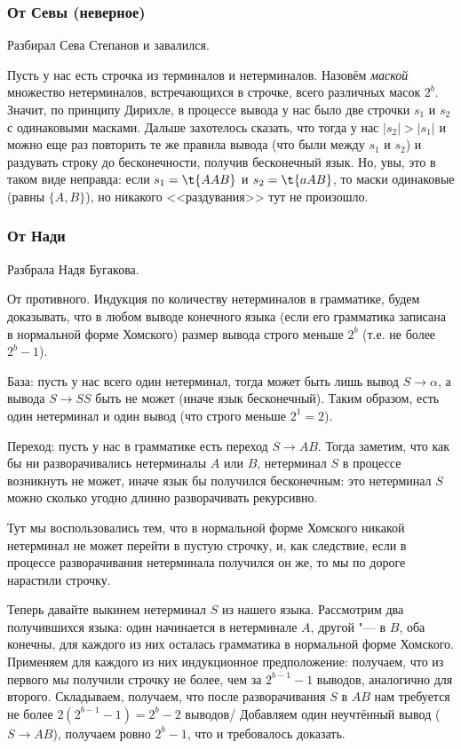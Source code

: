 	\subsubsection{От Севы (неверное)}
		Разбирал Сева Степанов и завалился.

		Пусть у нас есть строчка из терминалов и нетерминалов.
		Назовём \textit{маской} множество нетерминалов, встречающихся в строчке,
		всего различных масок $2^b$.
		Значит, по принципу Дирихле, в процессе вывода у нас было две строчки $s_1$ и $s_2$ с одинаковыми масками.
		Дальше захотелось сказать, что тогда у нас $|s_2|>|s_1|$ и можно еще раз повторить
		те же правила вывода (что были между $s_1$ и $s_2$) и раздувать строку до бесконечности, получив бесконечный язык.
		Но, увы, это в таком виде неправда: если $s_1=\t{AAB}$ и $s_2=\t{aAB}$, то маски одинаковые (равны $\{A, B\}$),
		но никакого <<раздувания>> тут не произошло.

	\subsubsection{От Нади}
		Разбрала Надя Бугакова.

		От противного.
		Индукция по количеству нетерминалов в грамматике, будем доказывать, что в любом выводе конечного языка
		(если его грамматика записана в нормальной форме Хомского) размер вывода строго меньше $2^b$ (т.е. не более $2^b-1$).

		База: пусть у нас всего один нетерминал, тогда может быть лишь вывод $S\to \alpha$,
		а вывода $S \to SS$ быть не может (иначе язык бесконечный).
		Таким образом, есть один нетерминал и один вывод (что строго меньше $2^1=2$).

		Переход: пусть у нас в грамматике есть переход $S \to AB$.
		Тогда заметим, что как бы ни разворачивались нетерминалы $A$ или $B$, нетерминал $S$ в процессе возникнуть не может,
		иначе язык бы получился бесконечным: это нетерминал $S$ можно сколько угодно длинно разворачивать рекурсивно.
		\begin{Rem}
			Тут мы воспользовались тем, что в нормальной форме Хомского никакой нетерминал не может перейти в пустую строчку,
			и, как следствие, если в процессе разворачивания нетерминала получился он же, то мы по дороге нарастили строчку.
		\end{Rem}
		Теперь давайте выкинем нетерминал $S$ из нашего языка.
		Рассмотрим два получившихся языка: один начинается в нетерминале $A$, другой "--- в $B$, оба конечны,
		для каждого из них осталась грамматика в нормальной форме Хомского.
		Применяем для каждого из них индукционное предположение: получаем, что из первого мы получили строчку не более, чем за $2^{b-1}-1$ выводов, аналогично для второго.
		Складываем, получаем, что после разворачивания $S$ в $AB$ нам требуется не более $2(2^{b-1}-1)=2^b-2$ выводов/
		Добавляем один неучтённый вывод ($S \to AB$), получаем ровно $2^b-1$, что и требовалось доказать.

